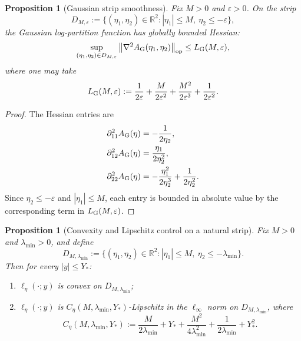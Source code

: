 \documentclass[11pt]{article}
\newtheorem{proposition}[theorem]{Proposition}
\theoremstyle{definition}
\newcommand{\R}{\mathbb{R}}
\newcommand{\norm}[1]{\left\lVert #1 \right\rVert}
\begin{document}
\begin{proposition}[Gaussian strip smoothness]
\label{prop:gaussian-smoothness-k1}
Fix $M>0$ and $\varepsilon>0$. On the strip
\[
  D_{M,\varepsilon}
  :=
  \{(\eta_1,\eta_2)\in\R^2: |\eta_1|\le M,\ \eta_2\le -\varepsilon\},
\]
the Gaussian log-partition function has globally bounded Hessian:
\[
  \sup_{(\eta_1,\eta_2)\in D_{M,\varepsilon}}
  \norm{\nabla^2 A_{\rm G}(\eta_1,\eta_2)}_{\mathrm{op}}
  \le
  L_{\rm G}(M,\varepsilon),
\]
where one may take
\[
  L_{\rm G}(M,\varepsilon)
  :=
  \frac{1}{2\varepsilon}
  +
  \frac{M}{2\varepsilon^2}
  +
  \frac{M^2}{2\varepsilon^3}
  +
  \frac{1}{2\varepsilon^2}.
\]
\end{proposition}

\begin{proof}
The Hessian entries are
\begin{align*}
  \partial_{11}^2 A_{\rm G}(\eta)
  &=
  -\frac{1}{2\eta_2},
  \\
  \partial_{12}^2 A_{\rm G}(\eta)
  &=
  \frac{\eta_1}{2\eta_2^2},
  \\
  \partial_{22}^2 A_{\rm G}(\eta)
  &=
  -\frac{\eta_1^2}{2\eta_2^3}+\frac{1}{2\eta_2^2}.
\end{align*}
Since $\eta_2\le -\varepsilon$ and $|\eta_1|\le M$, each entry is bounded in
absolute value by the corresponding term in $L_{\rm G}(M,\varepsilon)$.
\end{proof}

\begin{proposition}[Convexity and Lipschitz control on a natural strip]
\label{prop:convex-lipschitz-strip-k1}
Fix $M>0$ and $\lambda_{\min}>0$, and define
\[
  D_{M,\lambda_{\min}}
  :=
  \{(\eta_1,\eta_2)\in\R^2: |\eta_1|\le M,\ \eta_2\le -\lambda_{\min}\}.
\]
Then for every $|y|\le Y_\ast$:
\begin{enumerate}[label=(\roman*)]
  \item $\ell_\eta(\cdot;y)$ is convex on $D_{M,\lambda_{\min}}$;
  \item $\ell_\eta(\cdot;y)$ is
  $C_\eta(M,\lambda_{\min},Y_\ast)$-Lipschitz in the $\ell_\infty$ norm on
  $D_{M,\lambda_{\min}}$, where
  \begin{equation}
    C_\eta(M,\lambda_{\min},Y_\ast)
    :=
    \frac{M}{2\lambda_{\min}} + Y_\ast
    + \frac{M^2}{4\lambda_{\min}^2}
    + \frac{1}{2\lambda_{\min}}
    + Y_\ast^2.
    \label{eq:Ceta-k1}
  \end{equation}
\end{enumerate}
\end{proposition}
\end{document}
